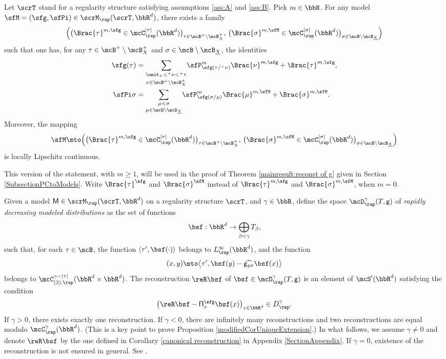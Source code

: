 \begin{thm}\label{PropDefnBracket}
Let $\scrT$ stand for a regularity structure satisfying assumptions \eqref{ass:A} and \eqref{ass:B}. Pick $m\in\bbN$. For any model $\sfM=(\sfg,\sfPi)\in\scrM_\rap(\scrT,\bbR^d)$, there exists a family
\[
\Bigl(\bigl(\Brac{\tau}^{m,\sfg}\in \mcC^{\vert\tau\vert}_\rap(\bbR^d)\bigr)_{\tau\in\mcB^+\setminus\mcB_X^+}, \, \bigl(\Brac{\sigma}^{m,\sfM}\in \mcC^{\vert\sigma\vert}_\rap(\bbR^d)\bigr)_{\sigma\in\mcB\setminus \mcB_{\underline{X}}} \Bigr)
\]
such that one has, for any $\tau\in\mcB^+\setminus\mcB_X^+$ and $\sigma\in\mcB\setminus \mcB_{\underline{X}}$, the identities
\begin{align}
\label{def:bracket g}
\sfg(\tau) &= \underset{\nu\in\mcB^+\setminus\mcB_X^+}{\sum_{\unit_+<^+\nu<^+\tau}} \sfP^m_{\sfg(\tau/^+\nu)}\Brac{\nu}^{m,\sfg} + \Brac{\tau}^{m,\sfg}, \\
\label{def:bracket Pi}
\sfPi\sigma &= \underset{\mu\in\mcB\setminus \mcB_{\underline{X}}}{\sum_{\mu<\sigma}} \sfP^m_{\sfg(\sigma/\mu)}\Brac{\mu}^{m,\sfM} + \Brac{\sigma}^{m,\sfM}.
\end{align}
Moreover, the mapping
\[
\sfM \mto \Bigl(\bigl(\Brac{\tau}^{m,\sfg}\in \mcC^{\vert\tau\vert}_\rap(\bbR^d)\bigr)_{\tau\in\mcB^+\setminus\mcB_X^+}, \, \bigl(\Brac{\sigma}^{m,\sfM}\in \mcC^{\vert\sigma\vert}_\rap(\bbR^d)\bigr)_{\sigma\in\mcB\setminus \mcB_{\underline{X}}} \Bigr)
\]
is locally Lipschitz continuous.
\end{thm}

This version of the statement, with $m\geq 1$, will be used in the proof of Theorem \ref{mainresult:reconst of g} given in Section \ref{SubsectionPCtoModels}. Write $\Brac{\tau}^\sfg$ and $\Brac{\sigma}^\sfM$ instead of $\Brac{\tau}^{m,\sfg}$ and $\Brac{\sigma}^{m,\sfM}$, when $m=0$.

Given a model ${\sf M}\in\scrM_\rap(\scrT,\bbR^d)$ on a regularity structure $\scrT$, and $\gamma\in\bbR$, define the space $\mcD^\gamma_\rap(T,\sf g)$ of \emph{rapidly decreasing modeled distributions} as the set of functions
\[
{\bsf} : \bbR^d\to\bigoplus_{\beta<\gamma} T_\beta,
\]
such that, for each $\tau\in\mcB$, the function $\langle\tau',{\bsf}(\cdot)\rangle$ belongs to $L^\infty_\rap(\bbR^d)$, and the function
\[
(x,y) \mto \big\langle\tau',{\bsf}(y) - \widehat{{\sf g}_{yx}}\bsf(x)\big\rangle
\]
belongs to $\mcC^{\gamma-\vert\tau\vert}_{(2),\rap}(\bbR^d\times\bbR^d)$. The reconstruction $\reR\bsf$ of $\bsf\in\mcD_{\rap}^\gamma(T,{\sf g})$ is an element of $\mcS'(\bbR^d)$ satisfying the condition
\[
\bigl(\reR\bsf - {\sf \Pi}^{\sfg}_x\bsf(x)\bigr)_{x\in\bbR^d}\in D^\gamma_\rap.
\]
If $\gamma>0$, there exists exactly one reconstruction. If $\gamma<0$, there are infinitely many reconstructions and two reconstructions are equal modulo $\mcC_{\rap}^\gamma(\bbR^d)$. (This is a key point to prove Proposition \ref{modifiedCorUniqueExtension}.) In what follows, we assume $\gamma\neq0$ and denote $\reR\bsf$ by the one defined in Corollary \ref{canonical reconstruction} in Appendix \ref{SectionAppendix}. If $\gamma=0$, existence of the reconstruction is not ensured in general. See \cite[Ex.\,5.5]{CZ}.

